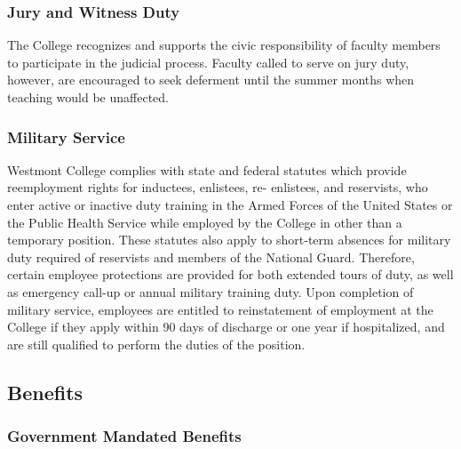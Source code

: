 \documentclass[letterpaper, 11pt]{article}
\begin{document}
		\subsubsection{Jury and Witness Duty}
			The College recognizes and supports the civic responsibility of faculty members to participate in the judicial process.  Faculty called to serve on jury duty, however, are encouraged to seek deferment until the summer months when teaching would be unaffected.

		\subsubsection{Military Service}
			Westmont College complies with state and federal statutes which provide reemployment rights for inductees, enlistees, re- enlistees, and reservists, who enter active or inactive duty training in the Armed Forces of the United States or the Public Health Service while employed by the College in other than a temporary position.  These statutes also apply to short-term absences for military duty required of reservists and members of the National Guard.  Therefore, certain employee protections are provided for both extended tours of duty, as well as emergency call-up or annual military training duty.  Upon completion of military service, employees are entitled to reinstatement of employment at the College if they apply within 90 days of discharge or one year if hospitalized, and are still qualified to perform the duties of the position.

	\subsection{Benefits}
		\subsubsection{Government Mandated Benefits}
\end{document}
